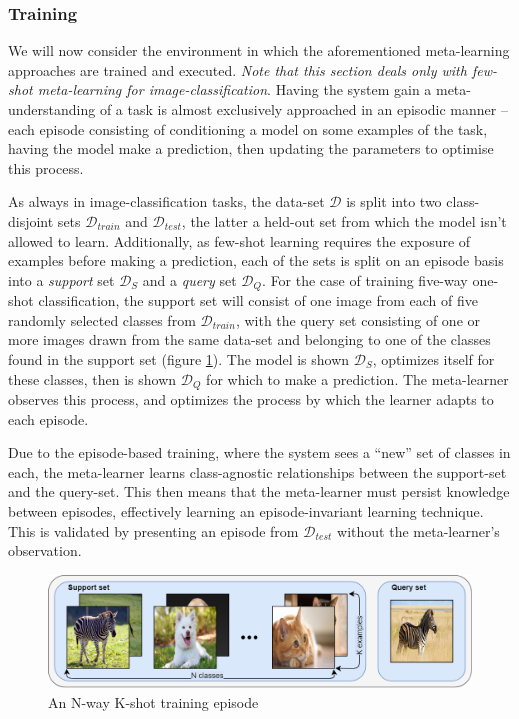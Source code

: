 \documentclass{report}
\begin{document}
	\subsubsection{Training}
	We will now consider the environment in which the aforementioned meta-learning approaches are trained and executed. \textit{Note that this section deals only with few-shot meta-learning for image-classification}. Having the system gain a meta-understanding of a task is almost exclusively approached in an episodic manner -- each episode consisting of conditioning a model on some examples of the task, having the model make a prediction, then updating the parameters to optimise this process. \par
	As always in image-classification tasks, the data-set $\mathcal{D}$ is split into two class-disjoint sets $\mathcal{D}_{train}$ and $\mathcal{D}_{test}$, the latter a held-out set from which the model isn't allowed to learn. Additionally, as few-shot learning requires the exposure of examples before making a prediction, each of the sets is split on an episode basis into a \textit{support} set $\mathcal{D}_{S}$ and a \textit{query} set $\mathcal{D}_{Q}$. For the case of training five-way one-shot classification, the support set will consist of one image from each of five randomly selected classes from $\mathcal{D}_{train}$, with the query set consisting of one or more images drawn from the same data-set and belonging to one of the classes found in the support set (figure \ref{fig:episode:1}). The model is shown $\mathcal{D}_S$, optimizes itself for these classes, then is shown $\mathcal{D}_Q$ for which to make a prediction. The meta-learner observes this process, and optimizes the process by which the learner adapts to each episode. \par
	Due to the episode-based training, where the system sees a ``new'' set of classes in each, the meta-learner learns class-agnostic relationships between the support-set and the query-set. This then means that the meta-learner must persist knowledge between episodes, effectively learning an episode-invariant learning technique. This is validated by presenting an episode from $\mathcal{D}_{test}$ without the meta-learner's observation. \par
	\begin{figure}[!h]
		\centering
		\includegraphics[width=14cm]{episode}
		\caption{An N-way K-shot training episode}
		\label{fig:episode:1}
	\end{figure}
	
\end{document}
